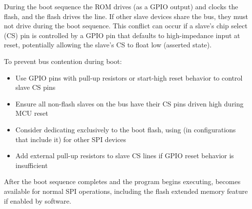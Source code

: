 During the boot sequence the ROM drives  (as a GPIO output) and clocks the flash, and the flash drives the  line. If other slave devices share the  bus, they must not drive  during the boot sequence. This conflict can occur if a slave's chip select (CS) pin is controlled by a GPIO pin that defaults to high-impedance input at reset, potentially allowing the slave's CS to float low (asserted state).

To prevent bus contention during boot:

\begin{itemize}
	\item Use GPIO pins with pull-up resistors or start-high reset behavior to control slave CS pins
	\item Ensure all non-flash slaves on the  bus have their CS pins driven high during MCU reset
	\item Consider dedicating  exclusively to the boot flash, using  (in configurations that include it) for other SPI devices
	\item Add external pull-up resistors to slave CS lines if GPIO reset behavior is insufficient
\end{itemize}

After the boot sequence completes and the program begins executing,  becomes available for normal SPI operations, including the flash extended memory feature if enabled by software.
